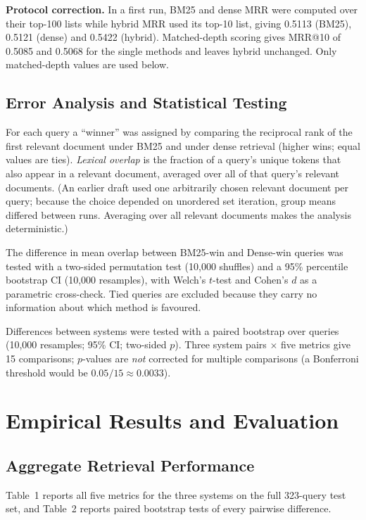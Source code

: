 \documentclass[10pt,letterpaper,twocolumn]{article}
\begin{document}
\textbf{Protocol correction.} In a first run, BM25 and dense MRR were computed over their top-100 lists while hybrid MRR used its top-10 list, giving 0.5113 (BM25), 0.5121 (dense) and 0.5422 (hybrid). Matched-depth scoring gives MRR@10 of 0.5085 and 0.5068 for the single methods and leaves hybrid unchanged. Only matched-depth values are used below.

\subsection{Error Analysis and Statistical Testing}
For each query a ``winner'' was assigned by comparing the reciprocal rank of the first relevant document under BM25 and under dense retrieval (higher wins; equal values are ties). \emph{Lexical overlap} is the fraction of a query's unique tokens that also appear in a relevant document, averaged over all of that query's relevant documents. (An earlier draft used one arbitrarily chosen relevant document per query; because the choice depended on unordered set iteration, group means differed between runs. Averaging over all relevant documents makes the analysis deterministic.)

The difference in mean overlap between BM25-win and Dense-win queries was tested with a two-sided permutation test (10,000 shuffles) and a 95\% percentile bootstrap CI (10,000 resamples), with Welch's $t$-test and Cohen's $d$ as a parametric cross-check. Tied queries are excluded because they carry no information about which method is favoured.

Differences between systems were tested with a paired bootstrap over queries (10,000 resamples; 95\% CI; two-sided $p$). Three system pairs $\times$ five metrics give 15 comparisons; $p$-values are \emph{not} corrected for multiple comparisons (a Bonferroni threshold would be $0.05/15\approx0.0033$).

\section{Empirical Results and Evaluation}
\subsection{Aggregate Retrieval Performance}
Table~1 reports all five metrics for the three systems on the full 323-query test set, and Table~2 reports paired bootstrap tests of every pairwise difference.
\end{document}

